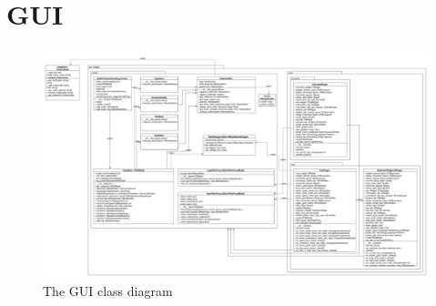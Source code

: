 

\section{GUI}
\begin{figure}[!ht]
\begin{center}
\includegraphics[width=1.0\linewidth]{./diagram_pictures/KlassendiagrammWidgets.pdf}
\caption{The GUI class diagram}
\end{center}
\end{figure}

\newpage

